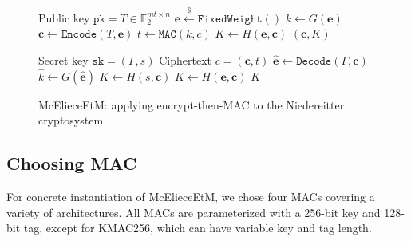 \documentclass[runningheads]{llncs}
\newcommand{\encap}{\texttt{Encap}}
\newcommand{\decap}{\texttt{Decap}}
\newcommand{\mac}{\texttt{MAC}}
\newcommand{\pk}{\texttt{pk}}
\newcommand{\sk}{\texttt{sk}}
\newcommand{\leftsample}{\stackrel{\$}{\leftarrow}}
\begin{document}
\begin{figure}[h]
    \centering
    
    \begin{minipage}[t]{0.48\textwidth}
        \begin{algorithm}[H]
            \caption{$\encap_\text{McElieceEtM}(\pk)$}
            \begin{algorithmic}[1]
                \Require Public key $\pk = T \in\mathbb{F}_2^{mt \times n}$
                \State $\mathbf{e} \leftsample \texttt{FixedWeight}()$
                \State $k \leftarrow G(\mathbf{e})$
                \State $\mathbf{c} \leftarrow \texttt{Encode}(T, \mathbf{e})$
                \State $t \leftarrow \mac(k, c)$
                \State $K \leftarrow H(\mathbf{e}, \mathbf{c})$
                \State \Return $(\mathbf{c}, K)$
            \end{algorithmic}
        \end{algorithm}
    \end{minipage}\hfill
    \begin{minipage}[t]{0.48\textwidth}
        \begin{algorithm}[H]
            \caption{$\decap_\text{McElieceEtM}(\sk, c)$}
            \begin{algorithmic}[1]
                \Require Secret key $\sk = (\Gamma, s)$
                \Require Ciphertext $c = (\mathbf{c}, t)$
                \State $\hat{\mathbf{e}} \leftarrow \texttt{Decode}(\Gamma, \mathbf{c})$
                \State $\hat{k} \leftarrow G(\hat{\mathbf{e}})$
                \If{$\mac(\hat{k}, \mathbf{c}) \neq t$}
                    \State $K \leftarrow H(s, \mathbf{c})$
                \Else
                    \State $K \leftarrow H(\mathbf{e}, \mathbf{c})$
                \EndIf
                \State\Return $K$
            \end{algorithmic}
        \end{algorithm}
    \end{minipage}

    \caption{McElieceEtM: applying encrypt-then-MAC to the Niedereitter cryptosystem}\label{fig:mceliece-plus}
\end{figure}

\subsection{Choosing MAC}\label{sec:choosing-mac}
For concrete instantiation of McElieceEtM, we chose four MACs covering a variety of architectures. All MACs are parameterized with a 256-bit key and 128-bit tag, except for KMAC256, which can have variable key and tag length.
\end{document}
